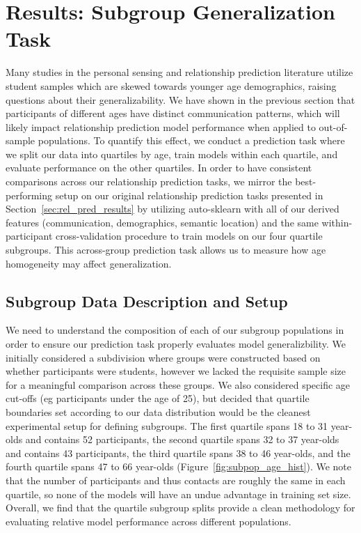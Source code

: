 \documentclass[acmlarge]{acmart}
\begin{document}
\section{Results: Subgroup Generalization Task}
\label{sec:subgroup_results}

 Many studies in the personal sensing and relationship prediction literature utilize student samples which are skewed towards younger age demographics, raising questions about their generalizability. We have shown in the previous section that participants of different ages have distinct communication patterns, which will likely impact relationship prediction model performance when applied to out-of-sample populations. To quantify this effect, we conduct a prediction task where we split our data into quartiles by age, train models within each quartile, and evaluate performance on the other quartiles. In order to have consistent comparisons across our relationship prediction tasks, we mirror the best-performing setup on our original relationship prediction tasks presented in Section~\ref{sec:rel_pred_results} by utilizing auto-sklearn with all of our derived features (communication, demographics, semantic location) and the same within-participant cross-validation procedure to train models on our four quartile subgroups. This across-group prediction task allows us to measure how age homogeneity may affect generalization.
 

\subsection{Subgroup Data Description and Setup}

We need to understand the composition of each of our subgroup populations in order to ensure our prediction task properly evaluates model generalizbility. We initially considered a subdivision where groups were constructed based on whether participants were students, however we lacked the requisite sample size for a meaningful comparison across these groups. We also considered specific age cut-offs (eg participants under the age of 25), but decided that quartile boundaries set according to our data distribution would be the cleanest experimental setup for defining subgroups. The first quartile spans 18 to 31 year-olds and contains 52 participants, the second quartile spans 32 to 37 year-olds and contains 43 participants, the third quartile spans 38 to 46 year-olds, and the fourth quartile spans 47 to 66 year-olds (Figure~\ref{fig:subpop_age_hist}). We note that the number of participants and thus contacts are roughly the same in each quartile, so none of the models will have an undue advantage in training set size. Overall, we find that the quartile subgroup splits provide a clean methodology for evaluating relative model performance across different populations.
\end{document}
